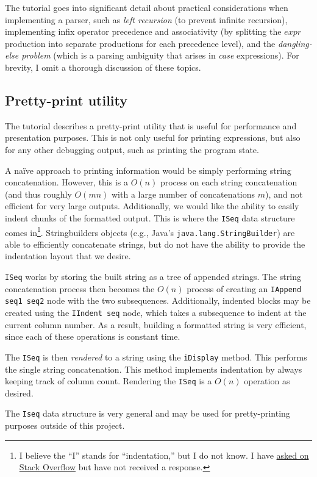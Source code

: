 The tutorial goes into significant detail about practical considerations when implementing a parser, such as \textit{left recursion} (to prevent infinite recursion), implementing infix operator precedence and associativity (by splitting the $expr$ production into separate productions for each precedence level), and the \textit{dangling-else problem} (which is a parsing ambiguity that arises in \textit{case} expressions). For brevity, I omit a thorough discussion of these topics.

\subsection{Pretty-print utility}
\label{sec:pretty-print}

The tutorial describes a pretty-print utility that is useful for performance and presentation purposes. This is not only useful for printing expressions, but also for any other debugging output, such as printing the program state.

A na\"ive approach to printing information would be simply performing string concatenation. However, this is a $O(n)$ process on each string concatenation (and thus roughly $O(mn)$ with a large number of concatenations $m$), and not efficient for very large outputs. Additionally, we would like the ability to easily indent chunks of the formatted output. This is where the \texttt{ISeq} data structure comes in\footnote{I believe the ``I'' stands for ``indentation,'' but I do not know. I have \href{https://stackoverflow.com/q/70888519/2397327}{asked on Stack Overflow} but have not received a response.}. Stringbuilders objects (e.g., Java's \texttt{java.lang.StringBuilder}) are able to efficiently concatenate strings, but do not have the ability to provide the indentation layout that we desire.

\texttt{ISeq} works by storing the built string as a tree of appended strings. The string concatenation process then becomes the $O(n)$ process of creating an \texttt{IAppend seq1 seq2} node with the two subsequences. Additionally, indented blocks may be created using the \texttt{IIndent seq} node, which takes a subsequence to indent at the current column number. As a result, building a formatted string is very efficient, since each of these operations is constant time.

The \texttt{ISeq} is then \textit{rendered} to a string using the \texttt{iDisplay} method. This performs the single string concatenation. This method implements indentation by always keeping track of column count. Rendering the \texttt{ISeq} is a $O(n)$ operation as desired.

The \texttt{Iseq} data structure is very general and may be used for pretty-printing purposes outside of this project.


